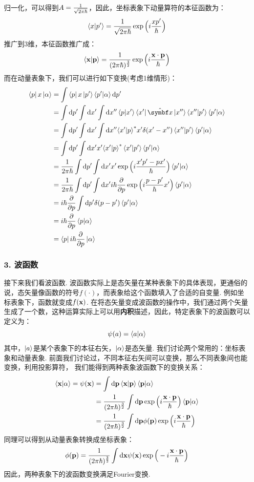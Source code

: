 归一化，可以得到\(A=\frac{1}{\sqrt{2\pi\hbar}}\)，因此，坐标表象下动量算符的本征函数为：
\[
\bra{x}\ket{p'} = \frac{1}{\sqrt{2\pi\hbar}}\exp\Big(i\frac{xp'}{\hbar}\Big)
\]
推广到3维，本征函数推广成：
\[
\bra{\mathbf{x}}\ket{\mathbf{p}} = \frac{1}{(2\pi\hbar)^{\frac{3}{2}}}\exp\Big(i\frac{\mathbf{x}\cdot\mathbf{p}}{\hbar}\Big)
\]
而在动量表象下，我们可以进行如下变换(考虑1维情形)：
\begin{align*}
\bra{p}x\ket{\al}
& = \int\bra{p}x\ket{p'}\bra{p'}\ket{\al}\dd p' \\
& = \int\dd p' \int\dd x'\int\dd x'' \bra{p}\ket{x'}\bra{x'}\uv{x}\ket{x''}\bra{x''}\ket{p'}\bra{p'}\ket{\al} \\
& = \int\dd p' \int\dd x'\int\dd x''{\bra{x'}\ket{p}}^{*}x'\delta(x'-x'')\bra{x''}\ket{p'}\bra{p'}\ket{\al} \\
& = \int\dd p' \int\dd x'x'{\bra{x'}\ket{p}}^{*}\bra{x'}\ket{p'}\bra{p'}\ket{\al} \\
& = \frac{1}{2\pi\hh}\int\dd p'\int\dd x'x'\exp\Big(i\frac{x'p'-p x'} {\hh}\Big)\bra{p'}\ket{\al} \\
& = \frac{1}{2\pi\hh}\int\dd p'\int\dd x' i\hh\pd{}{p}\exp\Big(i\frac{p-p'}{\hh}x'\Big)\bra{p'}\ket{\al} \\
& = i\hh\pd{}{p}\int\dd p'\delta(p-p')\braket{p'}{\al} \\
& = i\hh\pd{}{p}\braket{p}{\al} \\
& = \bra{p}i\hh\pd{}{p}\ket{\al}
\end{align*}
\subsubsection{3. 波函数}
接下来我们看波函数. 波函数实际上是态矢量在某种表象下的具体表现，更通俗的说，态矢量像函数的符号\(f(\cdot)\)，而表象给这个函数填入了合适的自变量. 例如坐标表象下，函数就变成\(f(\mathbf{x})\). 
在将态矢量变成波函数的操作中，我们通过两个矢量生成了一个数，这种运算实际上可以用\textbf{内积}描述，因此，特定表象下的波函数可以定义为：
\[
\psi(a) = \bra{a}\ket{\alpha}
\]
其中，\(\ket{a}\)是某个表象下的本征右矢，\(\ket{\alpha}\)是态矢量. 我们讨论两个常用的：坐标表象和动量表象. 前面我们讨论过，不同本征右矢间可以变换，那么不同表象间也能变换，利用投影算符，
我们能得到两种表象波函数下的变换关系：
\begin{align*}
\bra{\mathbf{x}}\ket{\alpha} = \psi(\mathbf{x})
& = \int\dd\mathbf{p}\bra{\mathbf{x}}\ket{\mathbf{p}}\bra{\mathbf{p}}\ket{\alpha} \\
& = \frac{1}{(2\pi\hbar)^{\frac{3}{2}}}\int\dd\mathbf{p}\exp\Big(i\frac{\mathbf{x}\cdot\mathbf{p}}{\hbar}\Big)\bra{\mathbf{p}}\ket{\alpha} \\
& = \frac{1}{(2\pi\hbar)^{\frac{3}{2}}}\int\dd\mathbf{p} \phi(\mathbf{p})\exp\Big(i\frac{\mathbf{x}\cdot\mathbf{p}}{\hbar}\Big)
\end{align*}
同理可以得到从动量表象转换成坐标表象：
\[
\phi(\mathbf{p}) = \frac{1}{(2\pi\hbar)^{\frac{3}{2}}}\int\dd\mathbf{x} \psi(\mathbf{x})\exp\Big(-i\frac{\mathbf{x}\cdot\mathbf{p}}{\hbar}\Big)
\]
因此，两种表象下的波函数变换满足Fourier变换. 

